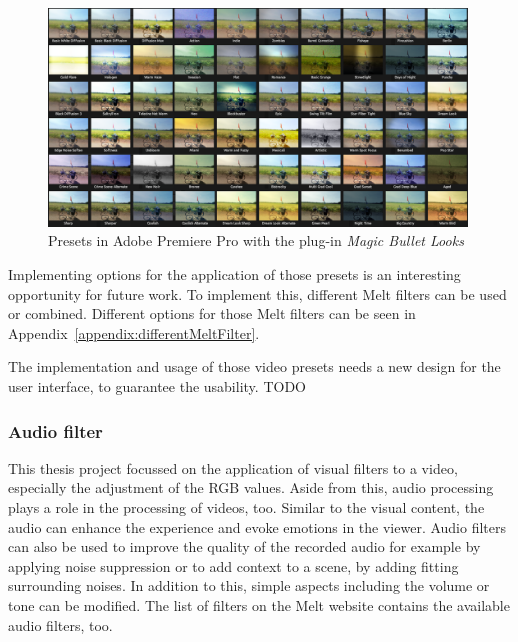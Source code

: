 \documentclass[../MasterThesis.tex]{subfiles}
\begin{document}
\begin{figure}[H]
	
	\centering
	
	\includegraphics[width=0.99\textwidth]{app.png}
	
	\caption[Presets in Adobe Premiere Pro (\textit{Magic Bullet Looks})]{Presets in Adobe Premiere Pro with the plug-in \textit{Magic Bullet Looks}~\cite{premierepro, magicbullet}}
	\label{figure:app}
	
\end{figure}

Implementing options for the application of those presets is an interesting opportunity for future work. To implement this, different Melt filters can be used or combined. Different options for those Melt filters can be seen in Appendix~\ref{appendix:differentMeltFilter}.

The implementation and usage of those video presets needs a new design for the user interface, to guarantee the usability. TODO












\subsubsection*{Audio filter}

This thesis project focussed on the application of visual filters to a video, especially the adjustment of the RGB values. Aside from this, audio processing plays a role in the processing of videos, too. Similar to the visual content, the audio can enhance the experience and evoke emotions in the viewer. Audio filters can also be used to improve the quality of the recorded audio for example by applying noise suppression or to add context to a scene, by adding fitting surrounding noises. In addition to this, simple aspects including the volume or tone can be modified.
The list of filters on the Melt website contains the available audio filters, too.~\cite{melt}
\end{document}
